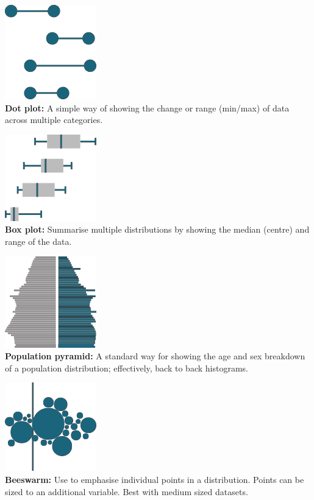 \documentclass[
  a4paper,
  onecolumn,
  oneside]{book}
\begin{document}
\includegraphics{part1/images/distribution2.png}\\
\textbf{Dot plot:} A simple way of showing the change or range (min/max)
of data across multiple categories.

\includegraphics{part1/images/distribution3.png}\\
\textbf{Box plot:} Summarise multiple distributions by showing the
median (centre) and range of the data.

\includegraphics{part1/images/distribution4.png}\\
\textbf{Population pyramid:} A standard way for showing the age and sex
breakdown of a population distribution; effectively, back to back
histograms.

\includegraphics{part1/images/distribution5.png}\\
\textbf{Beeswarm:} Use to emphasise individual points in a distribution.
Points can be sized to an additional variable. Best with medium sized
datasets.
\end{document}
